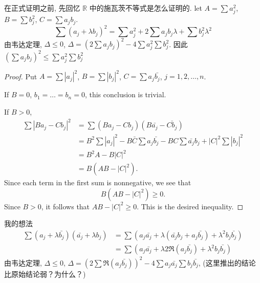 在正式证明之前, 先回忆 $\mathbb{R}$ 中的施瓦茨不等式是怎么证明的.
let $A = \sum a_j^2$, $B = \sum b_j^2$, $C = \sum a_j b_j$.
\begin{equation*}
    \sum (a_j+\lambda b_j)^2 = 
    \sum a_j^2 
    + 2\sum a_j b_j \lambda
    + \sum b_j^2 \lambda^2
\end{equation*}
由韦达定理, $\Delta \leq 0$, $\Delta= (2\sum a_j b_j )^2 - 4 \sum a_j^2\sum b_j^2$. 
因此 $(\sum a_j b_j )^2 \leq \sum a_j^2\sum b_j^2$
\begin{proof}
    Put $A = \sum |a_j|^2$, $B = \sum |b_j|^2$, $C = \sum a_j \bar{b_j}$, $j = 1,2,\dots,n$. 
    
    If $B = 0$, $b_1 = \dots = b_n = 0$, this conclusion is trivial.

    If $B > 0$, 
    \begin{align*}
        \sum \left|B a_j - C b_j\right|^2
        &= \sum (B a_j-C b_j)(B \bar{a_j} - \bar{C b_j})\\
        &= B^2\sum \left|a_j\right|^2 - B\bar{C}\sum a_j \bar{b_j} - BC \sum \bar{a_j} b_j + \left|C\right|^2\sum |b_j|^2\\
        &= B^2A-B|C|^2\\
        &= B(AB-|C|^2).
    \end{align*}
    Since each term in the first sum is nonnegative, we see that
    \begin{equation*}
        B(AB-|C|^2) \geq 0.
    \end{equation*}
    Since $B>0$, it follows that $AB-|C|^2 \geq 0$. This is the desired inequality.
\end{proof}

我的想法
\begin{align*}
    \sum (a_j + \lambda \bar{b_j})(\bar{a_j} + \lambda b_j)
    &=\sum(a_j\bar{a_j}+\lambda(\bar{a_j}b_j+a_j\bar{b_j})+\lambda^2 b_j\bar{b_j})\\
    &=\sum(a_j\bar{a_j}+\lambda 2\Re(a_j\bar{b_j}) +\lambda^2 b_j\bar{b_j})
\end{align*}
由韦达定理, $\Delta \leq 0$, $\Delta = (2\sum\Re(a_j\bar{b_j}))^2-4\sum a_j\bar{a_j}\sum b_j\bar{b_j}$, 
(这里推出的结论比原始结论弱？为什么？)
    
